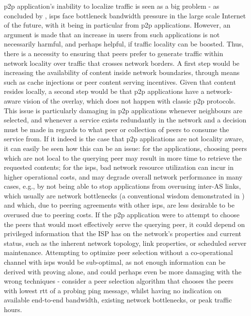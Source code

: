     \gls{p2p} application's inability to localize traffic is seen as a big problem - as concluded by \cite{liao2014}, \glspl{isp} face bottleneck bandwidth pressure in the large scale Internet of the future, with it being in particular from \gls{p2p} applications.
    However, an argument is made that an increase in users from such applications is not necessarily harmful, and perhaps helpful, if traffic locality can be boosted.
    Thus, there is a necessity to ensuring that peers prefer to generate traffic within network locality over traffic that crosses network borders.
    A first step would be increasing the availability of content inside network boundaries, through means such as cache injections or peer content serving incentives.
    Given that content resides locally, a second step would be that \gls{p2p} applications have a network-aware vision of the overlay, which does not happen with classic \gls{p2p} protocols.
    This issue is particularly damaging in \gls{p2p} applications whenever neighbours are selected, and whenever a service exists redundantly in the network and a decision must be made in regards to what peer or collection of peers to consume the service from.
    If it indeed is the case that \gls{p2p} applications are not locality aware, it can easily be seen how this can be an issue: for the applications, choosing peers which are not local to the querying peer may result in more time to retrieve the requested contents; for the \glspl{isp}, bad network resource utilization can incur in higher operational costs, and may degrade overall network performance in many cases, e.g., by not being able to stop applications from overusing inter-AS links, which usually are network bottlenecks (a conventional wisdom demonstrated in \cite{akella}) and which, due to peering agreements with other \glspl{isp}, are less desirable to be overused due to peering costs.
    If the \gls{p2p} application were to attempt to choose the peers that would most effectively serve the querying peer, it could depend on privileged information that the ISP has on the network's properties and current status, such as the inherent network topology, link properties, or scheduled server maintenance.
    Attempting to optimize peer selection without a co-operational channel with \glspl{isp} would be sub-optimal, as not enough information can be derived with proving alone, and could perhaps even be more damaging with the wrong techniques - consider a peer selection algorithm that chooses the peers with lowest \gls{rtt} of a probing ping message, whilst having no indication on available end-to-end bandwidth, existing network bottlenecks, or peak traffic hours.
